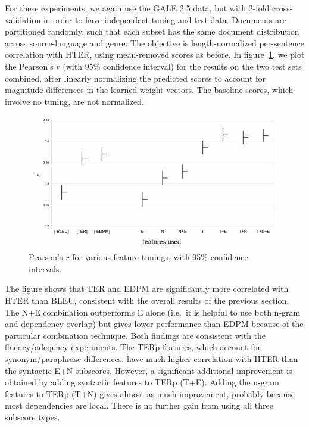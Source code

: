 \documentclass{kluwer}    %
\begin{document}
\begin{article}
For these experiments, we again use the GALE 2.5 data, but with 2-fold
cross-validation in order to have independent tuning and test data.
Documents are partitioned randomly, such that each subset has the same
document distribution across source-language and genre. The objective
is length-normalized per-sentence correlation with HTER, using
mean-removed scores as before. In figure~\ref{fig:tuneresults}, we
plot the Pearson's $r$ (with 95\% confidence interval) for the results
on the two test sets combined, after linearly normalizing the
predicted scores to account for magnitude differences in the learned
weight vectors.  The baseline scores, which involve no tuning, are not
normalized.

\begin{figure}
  \begin{center}
    \includegraphics[scale=0.45]{tuning}
  \end{center}
  \caption{Pearson's $r$ for various feature tunings, with 95\%
    confidence intervals.}
  \label{fig:tuneresults}
\end{figure}

The figure shows that TER and EDPM are significantly more correlated with HTER than BLEU, consistent with the overall results of the previous section. The N+E combination outperforms E alone (i.e.\ it is helpful to use both n-gram and dependency overlap) but gives lower performance than EDPM because of the particular combination technique. Both findings are consistent with the fluency/adequacy experiments. The TERp features, which account for synonym/paraphrase differences, have much higher correlation with HTER than the syntactic E+N subscores.  However, a significant additional improvement is obtained by adding syntactic features to TERp (T+E). Adding the n-gram features to TERp (T+N) gives almost as much improvement, probably because most dependencies are local.  There is no further gain from using all three subscore types.


\end{article}
\end{document}
